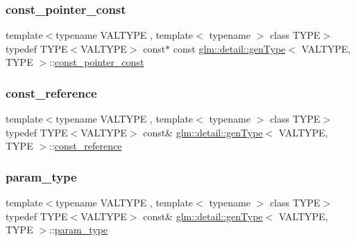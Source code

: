 \subsubsection{\texorpdfstring{const\+\_\+pointer\+\_\+const}{const\_pointer\_const}}
{\footnotesize\ttfamily template$<$typename V\+A\+L\+T\+Y\+PE , template$<$ typename $>$ class T\+Y\+PE$>$ \\
typedef T\+Y\+PE$<$V\+A\+L\+T\+Y\+PE$>$ const$\ast$ const \mbox{\hyperlink{structglm_1_1detail_1_1gen_type}{glm\+::detail\+::gen\+Type}}$<$ V\+A\+L\+T\+Y\+PE, T\+Y\+PE $>$\+::\mbox{\hyperlink{structglm_1_1detail_1_1gen_type_a4f3f1bc18abdbdba5757fc63052157fa}{const\+\_\+pointer\+\_\+const}}}

\mbox{\label{structglm_1_1detail_1_1gen_type_a509ca374a85f8a9ea319bc5a980d5f1a}} 
\subsubsection{\texorpdfstring{const\+\_\+reference}{const\_reference}}
{\footnotesize\ttfamily template$<$typename V\+A\+L\+T\+Y\+PE , template$<$ typename $>$ class T\+Y\+PE$>$ \\
typedef T\+Y\+PE$<$V\+A\+L\+T\+Y\+PE$>$ const\& \mbox{\hyperlink{structglm_1_1detail_1_1gen_type}{glm\+::detail\+::gen\+Type}}$<$ V\+A\+L\+T\+Y\+PE, T\+Y\+PE $>$\+::\mbox{\hyperlink{structglm_1_1detail_1_1gen_type_a509ca374a85f8a9ea319bc5a980d5f1a}{const\+\_\+reference}}}

\mbox{\label{structglm_1_1detail_1_1gen_type_a92c8b989f574a63d4e0f5bfc8a4f3a32}} 
\subsubsection{\texorpdfstring{param\+\_\+type}{param\_type}}
{\footnotesize\ttfamily template$<$typename V\+A\+L\+T\+Y\+PE , template$<$ typename $>$ class T\+Y\+PE$>$ \\
typedef T\+Y\+PE$<$V\+A\+L\+T\+Y\+PE$>$ const\& \mbox{\hyperlink{structglm_1_1detail_1_1gen_type}{glm\+::detail\+::gen\+Type}}$<$ V\+A\+L\+T\+Y\+PE, T\+Y\+PE $>$\+::\mbox{\hyperlink{structglm_1_1detail_1_1gen_type_a92c8b989f574a63d4e0f5bfc8a4f3a32}{param\+\_\+type}}}

